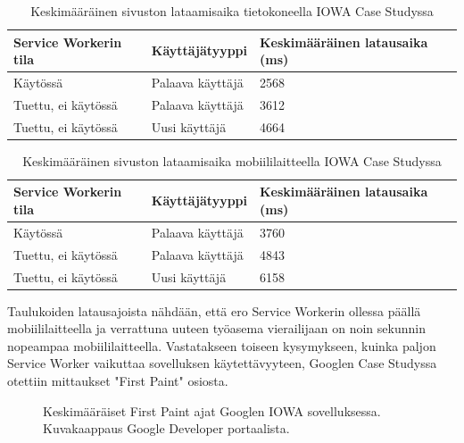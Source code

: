 \documentclass{tktltiki}
\begin{document}
\begin{table}[h]
\centering
\begin{small}
\caption{Keskimääräinen sivuston lataamisaika tietokoneella IOWA Case Studyssa \cite{Walton} }
\begin{tabular}{|L{5cm}|L{5cm}|L{5cm}|}
\hline
\textbf{Service Workerin tila} & 
\textbf{Käyttäjätyyppi} &
\textbf{Keskimääräinen latausaika (ms)}
\\ \hline
Käytössä & 
Palaava käyttäjä &
2568
\\ \hline
Tuettu, ei käytössä & 
Palaava käyttäjä &
3612
\\ \hline
Tuettu, ei käytössä & 
Uusi käyttäjä &
4664
\\ \hline
\end{tabular}
\label{table:loading time on pc}
\end{small}
\end{table}

\clearpage

\begin{table}[h]
\centering
\begin{small}
\caption{Keskimääräinen sivuston lataamisaika mobiililaitteella IOWA Case Studyssa \cite{Walton} }
\begin{tabular}{|L{5cm}|L{5cm}|L{5cm}|}
\hline
\textbf{Service Workerin tila} & 
\textbf{Käyttäjätyyppi} &
\textbf{Keskimääräinen latausaika (ms)}
\\ \hline
Käytössä & 
Palaava käyttäjä &
3760
\\ \hline
Tuettu, ei käytössä & 
Palaava käyttäjä &
4843
\\ \hline
Tuettu, ei käytössä & 
Uusi käyttäjä &
6158
\\ \hline
\end{tabular}
\label{table:loading time on mobile}
\end{small}
\end{table}


Taulukoiden latausajoista nähdään, että ero Service Workerin ollessa päällä mobiililaitteella ja verrattuna uuteen työasema vierailijaan on noin sekunnin nopeampaa mobiililaitteella. Vastatakseen toiseen kysymykseen, kuinka paljon Service Worker vaikuttaa sovelluksen käytettävyyteen, Googlen Case Studyssa otettiin mittaukset "First Paint" osiosta.

\begin{figure}[!h]
\begin{center}
\caption{Keskimääräiset First Paint ajat Googlen IOWA sovelluksessa. Kuvakaappaus Google Developer portaalista.}
\label{Google AVG load times 1}
\end{center}
\end{figure}
\end{document}
